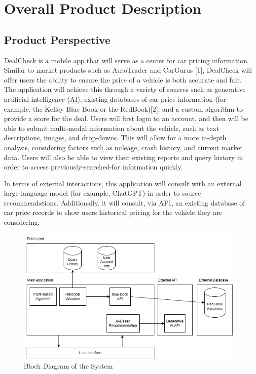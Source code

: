 \documentclass[]{article}
\begin{document}

\section{Overall Product Description}
\label{sec:overall_description}

\subsection{Product Perspective}
\label{sub:product_perspective}
DealCheck is a mobile app that will serve as a center for car pricing information. Similar to market products such as AutoTrader and CarGurus [1], DealCheck 
will offer users the ability to ensure the price of a vehicle is both accurate and fair. The application will achieve this through a variety of sources 
such as generative artificial intelligence (AI), existing databases of car price information (for example, the Kelley Blue Book or the RedBook)[2], and a custom algorithm 
to provide a score for the deal. Users will first login to an account, and then will be able to submit multi-modal information about the vehicle, such as 
text descriptions, images, and drop-downs. This will allow for a more in-depth analysis, considering factors such as mileage, crash history, and current 
market data. Users will also be able to view their existing reports and query history in order to access previously-searched-for information quickly. \newline

\noindent In terms of external interactions, this application will consult with an external large-language model (for example, ChatGPT) in order to source recommendations. 
Additionally, it will consult, via API, an existing database of car price records to show users historical pricing for the vehicle they are considering.

\begin{figure}[htb!]
	\centering
	\includegraphics[scale=0.5]{Images/system_block_diagram.png}
	\caption{Block Diagram of the System}\label{Fig:2.1}
\end{figure}
\end{document}
